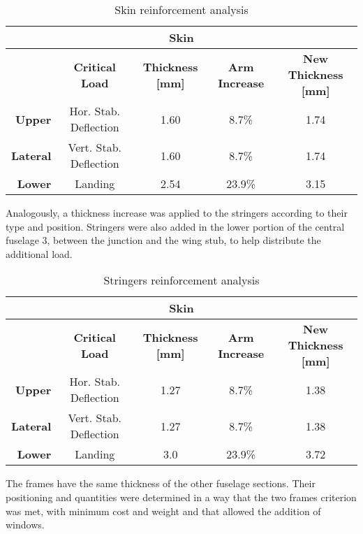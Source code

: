 \begin{table}[htbp]
  \centering
  \caption{Skin reinforcement analysis}
    \begin{tabular}{rcccc}
    \toprule
    \multicolumn{5}{c}{\textbf{Skin}} \\
    \midrule
          & \textbf{Critical Load} & \textbf{Thickness [mm]} & \textbf{Arm Increase} & \textbf{New Thickness [mm]} \\
    \textbf{Upper} & Hor. Stab. Deflection & 1.60  & 8.7\% & 1.74 \\
    \textbf{Lateral} & Vert. Stab. Deflection & 1.60  & 8.7\% & 1.74 \\
    \textbf{Lower} & Landing & 2.54  & 23.9\% & 3.15 \\
    \bottomrule
    \end{tabular}%
  \label{tab:skin_reinforcement}%
\end{table}%

Analogously, a thickness increase was applied to the stringers according to their type and position. Stringers were also added in the lower portion of the central fuselage 3, between the junction and the wing stub, to help distribute the additional load.

\begin{table}[htbp]
  \centering
  \caption{Stringers reinforcement analysis}
    \begin{tabular}{rcccc}
    \toprule
    \multicolumn{5}{c}{\textbf{Skin}} \\
    \midrule
          & \textbf{Critical Load} & \textbf{Thickness [mm]} & \textbf{Arm Increase} & \textbf{New Thickness [mm]} \\
    \textbf{Upper} & Hor. Stab. Deflection & 1.27  & 8.7\% & 1.38 \\
    \textbf{Lateral} & Vert. Stab. Deflection & 1.27  & 8.7\% & 1.38 \\
    \textbf{Lower} & Landing & 3.0   & 23.9\% & 3.72 \\
    \bottomrule
    \end{tabular}%
  \label{tab:stringers_reinforcement}%
\end{table}%

The frames have the same thickness of the other fuselage sections. Their positioning and quantities were determined in a way that the two frames criterion was met, with minimum cost and weight and that allowed the addition of windows.

